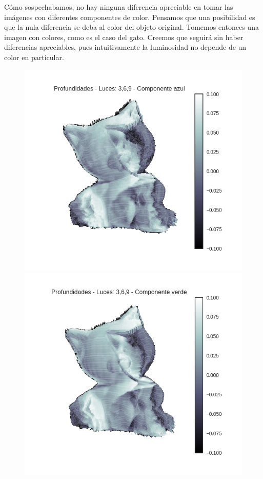 Cómo sospechabamos, no hay ninguna diferencia apreciable en tomar las imágenes con diferentes componentes de color. Pensamos que una posibilidad es que la nula diferencia se deba al color del objeto original. Tomemos entonces una imagen con colores, como es el caso del gato. Creemos que seguirá sin haber diferencias apreciables, pues intuitivamente la luminosidad no depende de un color en particular. \\


\begin{figure}[H]
\centering
\begin{minipage}{.5\textwidth}
  \centering
  \includegraphics[width=1\linewidth]{informe/imagenes/profundidades/gato369Azul.png}
\end{minipage}%
\begin{minipage}{.5\textwidth}
  \centering
    \includegraphics[width=1\linewidth]{informe/imagenes/profundidades/gato369Verde.png}

\end{minipage}
\end{figure}
